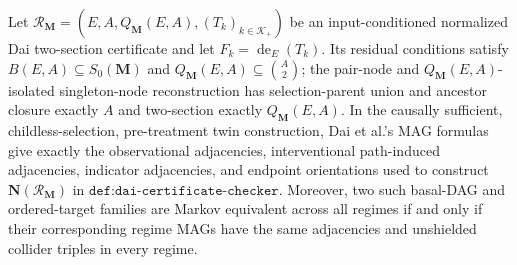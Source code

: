 Let \(\mathcal R_{\mathbf M}=(E,A,Q_{\mathbf M}(E,A),(T_k)_{k\in\mathcal K_+})\) be an input-conditioned normalized Dai two-section certificate and let \(F_k=\operatorname{de}_E(T_k)\).  Its residual conditions satisfy \(B(E,A)\subseteq S_0(\mathbf M)\) and \(Q_{\mathbf M}(E,A)\subseteq\binom A2\); the pair-node and \(Q_{\mathbf M}(E,A)\)-isolated singleton-node reconstruction has selection-parent union and ancestor closure exactly \(A\) and two-section exactly \(Q_{\mathbf M}(E,A)\).  In the causally sufficient, childless-selection, pre-treatment twin construction, Dai et al.'s MAG formulas give exactly the observational adjacencies, interventional path-induced adjacencies, indicator adjacencies, and endpoint orientations used to construct \(\mathbf N(\mathcal R_{\mathbf M})\) in \(\texttt{def:dai-certificate-checker}\).  Moreover, two such basal-DAG and ordered-target families are Markov equivalent across all regimes if and only if their corresponding regime MAGs have the same adjacencies and unshielded collider triples in every regime.